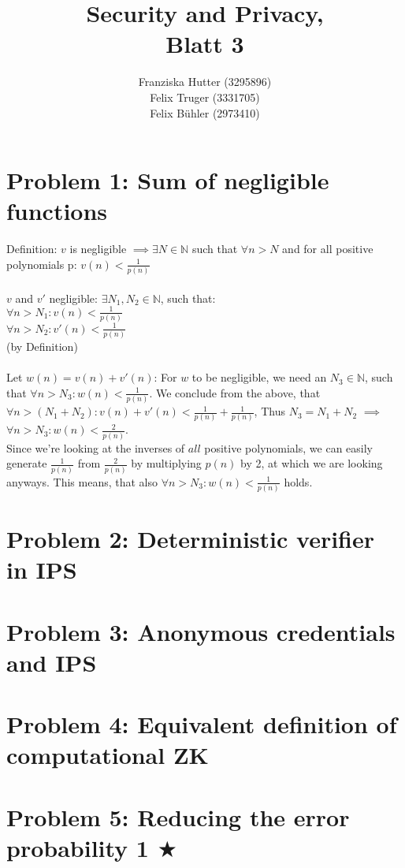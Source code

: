 \documentclass[12pt,pdftex,a4paper]{article}
\title{Security and Privacy,\\ Blatt 3}
\author{Franziska Hutter (3295896)\\
	Felix Truger (3331705)\\
	Felix Bühler (2973410)}
\newcommand\tab[1][1cm]{\hspace*{#1}}
\begin{document}
\maketitle
\pagebreak

\section*{Problem 1: Sum of negligible functions}
Definition: $v$ is negligible $\implies \exists N \in\mathbb{N}$ such that $\forall n>N$ and for all positive polynomials p: 
$v(n) < \frac{1}{p(n)}$
\\~\\
$v$ and $v'$ negligible: $\exists N_1, N_2 \in \mathbb{N}$, such that: \\
\tab $\forall n>N_1: v(n) < \frac{1}{p(n)}$\\
\tab $\forall n>N_2: v'(n) < \frac{1}{p(n)}$\\
(by Definition)\\
\\
Let $w(n) = v(n) + v'(n)$: For $w$ to be negligible, we need an $N_3\in\mathbb{N}$, such that $\forall n>N_3: w(n) < \frac{1}{p(n)}$.
We conclude from the above, that $\forall n>(N_1+N_2): v(n) + v'(n) < \frac{1}{p(n)} + \frac{1}{p(n)}$, Thus $N_3 = N_1 + N_2$ $\implies$ $\forall n > N_3: w(n) < \frac{2}{p(n)}$.\\ %
Since we're looking at the inverses of $all$ positive polynomials, we can easily generate $\frac{1}{p(n)}$ from $\frac{2}{p(n)}$ by multiplying $p(n)$ by 2, at which we are looking anyways. This means, that also $\forall n>N_3: w(n) < \frac{1}{p(n)}$ holds.


\section*{Problem 2: Deterministic verifier in IPS}

\section*{Problem 3: Anonymous credentials and IPS}

\section*{Problem 4: Equivalent definition of computational ZK}

\section*{Problem 5: Reducing the error probability 1 $\bigstar$}
\end{document}

